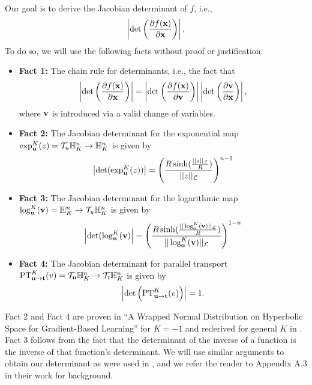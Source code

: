 Our goal is to derive the Jacobian determinant of $f$, i.e., 
\begin{equation}
    \left|\textrm{det}\left(\frac{\partial f(\mathbf{x})}{\partial \mathbf{x}}\right)\right|,
\end{equation}
To do so, we will use the following facts without proof or justification:
\begin{itemize}
    \item 
    \textbf{Fact 1: }The chain rule for determinants, i.e., the fact that
    \begin{equation}
        \left|\textrm{det}\left(\frac{\partial f(\mathbf{x})}{\partial \mathbf{x}}\right)\right| =  \left|\textrm{det}\left(\frac{\partial f(\mathbf{x})}{\partial \mathbf{v}}\right)\right| \left|\textrm{det}\left(\frac{\partial \mathbf{v}}{\partial \mathbf{x}}\right)\right|,
    \end{equation}
    where $\mathbf{v}$ is introduced via a valid change of variables. 
    \item 
    \textbf{Fact 2: } The Jacobian determinant for the exponential map $\exp^K_{\mathbf{u}}(z) = \mathcal{T}_{u}\mathbb{H}^n_K \rightarrow \mathbb{H}^n_K$ is given by
    \begin{equation}
        \left|\textrm{det}(\exp^K_{\mathbf{u}}(z))\right| =
        \left(\frac{R\sinh(\frac{||z||_{\mathcal{L}}}{R})}{||z||_{\mathcal{L}}}\right)^{n-1}
    \end{equation}
        \item 
    \textbf{Fact 3: } The Jacobian determinant for the logarithmic map $\log^K_{\mathbf{u}}(\mathbf{v}) = \mathbb{H}^n_K \rightarrow \mathcal{T}_u\mathbb{H}^n_K$ is given by
    \begin{equation}
        \left|\textrm{det}(\log^K_{\mathbf{u}}(\mathbf{v})\right| =
        \left(\frac{R\sinh(\frac{||\log^K_{\textbf{o}}(\textbf{v})||_{\mathcal{L}}}{R})}{||\log^K_{\textbf{o}}(\textbf{v})||_{\mathcal{L}}}\right)^{1-n}
    \end{equation}
    \item
     \textbf{Fact 4: } The Jacobian determinant for parallel transport $\textnormal{PT}^K_{\mathbf{u} \rightarrow \mathbf{t}}(v) = \mathcal{T}_{\mathbf{u}}\mathbb{H}^n_K \rightarrow \mathcal{T}_t\mathbb{H}^n_K$ is given by
    \begin{equation}
        \left|\textrm{det}\left(\textnormal{PT}^K_{\mathbf{u} \rightarrow \mathbf{t}}(v)\right)\right| = 1.
    \end{equation}
\end{itemize}
Fact 2 and Fact 4 are proven in \citet{nagano2019wrapped} ``A Wrapped Normal Distribution on Hyperbolic Space for Gradient-Based Learning'' for $K=-1$ and rederived for general $K$ in \citet{skopek2019mixed}. Fact 3 follows from the fact that the determinant of the inverse of a function is the inverse of that function's determinant. 
We will use similar arguments to obtain our determinant as were used in \citet{nagano2019wrapped}, and we refer the reader to Appendix A.3 in their work for background. 

